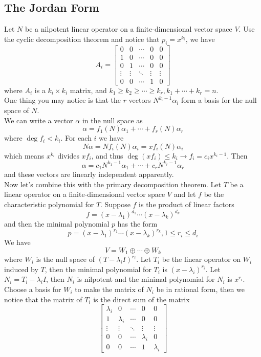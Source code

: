 \documentclass{article}
\begin{document}
\subsection{The Jordan Form}
Let $N$ be a nilpotent linear operator on a finite-dimensional vector space $V$. Use the cyclic decomposition theorem and notice that $p_i=x^{k_i}$, we have
\[A_i=\begin{bmatrix}
	0&0&\cdots&0&0\\
	1&0&\cdots&0&0\\
	0&1&\cdots&0&0\\
	\vdots&\vdots&\ddots&\vdots&\vdots\\
	0&0&\cdots&1&0
\end{bmatrix}\]
where $A_i$ is a $k_i\times k_i$ matrix, and $k_1\ge k_2\ge\cdots\ge k_r,k_1+\cdots+k_r=n$.\\
\indent One thing you may notice is that the $r$ vectors $N^{k_i-1}\alpha_i$ form a basis for the null space of $N$.\\
\indent We can write a vector $\alpha$ in the null space as
\[\alpha=f_1(N)\alpha_1+\cdots+f_r(N)\alpha_r\]
where $\deg f_i<k_i$. For each $i$ we have
\[N\alpha=Nf_i(N)\alpha_i=xf_i(N)\alpha_i\]
which means $x^{k_i}$ divides $xf_i$, and thus $\deg(xf_i)\le k_i\rightarrow f_i=c_ix^{k_i-1}$. Then
\[\alpha=c_1N^{k_1-1}\alpha_1+\cdots+c_rN^{k_r-1}\alpha_r\]
and these vectors are linearly independent apparently.\\
\indent Now let's combine this with the primary decomposition theorem. Let $T$ be a linear operator on a finite-dimensional vector space $V$ and let $f$ be the characteristic polynomial for $T$. Suppose $f$ is the product of linear factors
\[f=(x-\lambda_1)^{d_1}\cdots(x-\lambda_k)^{d_k}\]
and then the minimal polynomial $p$ has the form
\[p=(x-\lambda_1)^{r_1}\cdots(x-\lambda_k)^{r_k},1\le r_i\le d_i\]
We have
\[V=W_1\oplus\cdots\oplus W_k\]
where $W_i$ is the null space of $(T-\lambda_iI)^{r_i}$. Let $T_i$ be the linear operator on $W_i$ induced by $T$, then the minimal polynomial for $T_i$ is $(x-\lambda_i)^{r_i}$. Let $N_i=T_i-\lambda_iI$, then $N_i$ is nilpotent and the minimal polynomial for $N_i$ is $x^{r_i}$. Choose a basis for $W_i$ to make the matrix of $N_i$ be in rational form, then we notice that the matrix of $T_i$ is the direct sum of the matrix
\[\begin{bmatrix}
	\lambda_i&0&\cdots&0&0\\
	1&\lambda_i&\cdots&0&0\\
	\vdots&\vdots&\ddots&\vdots&\vdots\\
	0&0&\cdots&\lambda_i&0\\
	0&0&\cdots&1&\lambda_i
\end{bmatrix}\]
\end{document}
